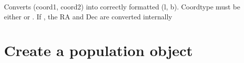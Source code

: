 \documentclass[letterpaper,10pt,english]{sphinxmanual}
\begin{document}

\begin{fulllineitems}
\label{\detokenize{module-level-docs:survey.Pointing}}
\pysigstartsignatures
\pysigline
{}
\pysigstopsignatures
\end{fulllineitems}


\begin{fulllineitems}
\label{\detokenize{module-level-docs:survey.Pointing.__init__}}
\pysigstartsignatures
\pysiglinewithargsret
{}
{\sphinxparamcomma {}\sphinxparamcomma {}}
{}
\pysigstopsignatures
\sphinxAtStartPar
Converts (coord1, coord2) into correctly formatted (l, b). Coordtype must be
either  or . If , the RA and Dec are converted internally

\end{fulllineitems}



\section{ \textendash{} Create a population object}
\label{\detokenize{module-level-docs:module-populate}}\label{\detokenize{module-level-docs:populate-create-a-population-object}}\label{\detokenize{module-level-docs:populate-module-docs}}

\begin{fulllineitems}
\label{\detokenize{module-level-docs:populate.Populate}}
\pysigstartsignatures
\pysigline
{}
\pysigstopsignatures
\end{fulllineitems}
\end{document}
